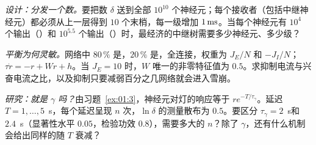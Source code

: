 \begin{exercise}[\lvlB]
\label{ex:01:5}
\emph{设计：分发一个数。}要把数 $\delta$ 送到全部 $10^{10}$ 个神经元；每个接收者（包括中继神经元）都必须从上一层得到 $10$ 个末梢，每一级增加 $1\,\text{ms}$。当每个神经元有 $10^4$ 个输出（）和 $10^{5.5}$ 个输出（）时，最经济的中继树需要多少神经元、多少级？
\end{exercise}

\begin{exercise}[\lvlB]
\label{ex:01:6}
\emph{平衡为何灵敏。}网络中 $80\,\%$ 是，$20\,\%$ 是，全连接，权重为 $J_E/N$ 和 $-J_I/N$；$\tau\dot r=-r+Wr+h$。当 $J_E=10$ 时，$W$ 唯一的非零特征值为 $0.5$。求抑制电流与兴奋电流之比，以及抑制只要减弱百分之几网络就会进入雪崩。
\end{exercise}

\begin{exercise}[\lvlC]
\label{ex:01:7}
\emph{研究：就是 $\gamma$ 吗？}由习题~\ref{ex:01:3}，神经元对灯的响应等于 $re^{-T/\tau_\gamma}$。延迟 $T=1,\dots,5$~s，每个延迟呈现 $n$ 次，$\ln\delta$ 的测量散布为 $0.5$。要区分 $\tau_\gamma=2$~s和 $2.4$~s（显著性水平 $0.05$，检验功效 $0.8$），需要多大的 $n$？除了 $\gamma$，还有什么机制会给出同样的随 $T$ 衰减？
\end{exercise}
